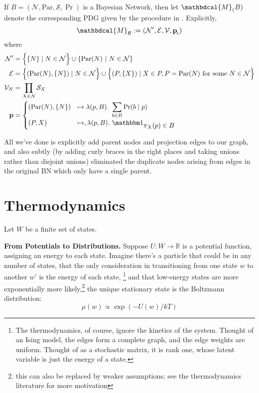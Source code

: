 \documentclass{article}
\theoremstyle{plain}
\theoremstyle{definition}
\theoremstyle{remark}
\newcommand\mat[1]{\mathbf{#1}}
\newcommand{\bp}[1][L]{\mat{p}_{\!_{#1}\!}}
\newcommand{\Ed}{\mathcal E}
\newcommand{\dg}[1]{\mathbdcal{#1}}
\newcommand{\PDGof}[1]{{\dg M}_{#1}}
\numberwithin{equation}{section}
\begin{document}
{\begin{defn} \label{def:bnconvert-formal}
	If $B = (\mathcal N, \mathrm{Par}, \mathcal S, \Pr)$ is a Bayesian Network, then let $\PDGof (B)$ denote the corresponding PDG given by the procedure in . Explicitly, 
	\[ \PDGof{{\mathcal B}} :=  (\mathcal N', \Ed, \mathcal V,
			\bp) \] 
	where %
	\begin{align*}
	\mathcal N' &=  \left\{ \Big.\{N\} \mid N \in \mathcal N\right\} \cup \left\{ \mathrm{Par}(N) ~\middle|~ N \in \cal N \right\} \\%
	\Ed &= \left\{ \vphantom{\Big|}(\mathrm{Par}(N), \{N\}) \mid N \in \mathcal N \right\} \cup 
	\left\{\vphantom{\Big|} (P, \{X\}) \mid X \in P, P = \mathrm{Par}(N) \text{ for some }N \in \mathcal N \right\} \\
	\mathcal V_N &= \prod_{X \in N} \mathcal S_X \\
	\mathbf p &= \begin{cases}
	(\mathrm{Par}(N), \{N\}) &\mapsto \lambda(p, B).~ \displaystyle\sum_{b \in  B} \Pr(b \mid p) \\
	(P, X) &\mapsto, \lambda (p, B).~ \displaystyle \mathbbm 1_{\displaystyle\pi_X(p) \in B}
	\end{cases}
	\end{align*}
\end{defn}
All we've done is explicitly add parent nodes and projection edges to our graph, and also subtly (by adding curly braces in the right places and taking unions rather than disjoint unions) eliminated the duplicate nodes arising from edges in the original BN which only have a single parent.

\section{Thermodynamics}\label{sec:thermo-background}
Let $W$ be a finite set of states.

\textbf{From Potentials to Distributions.}
Suppose $U: W \to \mathbb R$ is a potential function, assigning an energy to each state. Imagine there's a particle that could be in any number of states, that the only consideration in transitioning from one state $w$ to another $w'$ is the energy of each state,%
	\footnote{The thermodynamics, of course, ignore the kinetics of the system. Thought of an Ising model, the edges form a complete graph, and the edge weights are uniform. Thought of as a stochastic matrix, it is rank one, whose latent variable is just the energy of a state.}
and that low-energy states are more exponentially more likely,\footnote{this can also be replaced by weaker assumptions; see the thermodynamics literature for more motivation}
the unique stationary state is the Boltzmann distribution:
\begin{equation}
	 \mu(w) \propto \exp( - U(w) / kT ) \label{eq:boltzmann-appendix}
\end{equation}

}
\end{document}
